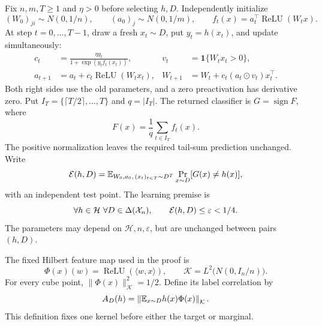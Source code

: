 \documentclass[11pt,letterpaper,pmlr,twoside]{jmlr}
\newcommand{\X}{\mathcal X}\newcommand{\Hc}{\mathcal H}
\newcommand{\Kc}{\mathcal K}\newcommand{\sgn}{\operatorname{sign}}
\newcommand{\relu}{\operatorname{ReLU}}\newcommand{\dc}{\operatorname{dc}}
\newcommand{\ind}{\mathbf1}\newcommand{\eps}{\varepsilon}
\newcommand{\ip}[2]{\langle #1,#2\rangle}\newcommand{\norm}[1]{\lVert #1\rVert}
\begin{document}
Fix $n,m,T\ge1$ and $\eta>0$ before selecting $h,D$. Independently initialize
\begin{equation}
 (W_0)_{ji}\sim N(0,1/n),\qquad (a_0)_j\sim N(0,1/m),
 \qquad f_t(x)=a_t^\top\relu(W_tx).
 \label{eq:init}
\end{equation}
At step $t=0,\ldots,T-1$, draw a fresh $x_t\sim D$, put $y_t=h(x_t)$, and update simultaneously:
\begin{equation}
 \begin{aligned}
 c_t&=\frac{\eta y_t}{1+\exp(y_tf_t(x_t))},
 &v_t&=\ind\{W_tx_t>0\},\\
 a_{t+1}&=a_t+c_t\relu(W_tx_t),
 &W_{t+1}&=W_t+c_t(a_t\odot v_t)x_t^\top.
 \end{aligned}
 \label{eq:actual}
\end{equation}
Both right sides use the old parameters, and a zero preactivation has derivative zero. Put $I_T=\{\lceil T/2\rceil,\ldots,T\}$ and $q=|I_T|$. The returned classifier is $G=\sgn F$, where
\begin{equation}
 F(x)=\frac1q\sum_{t\in I_T}f_t(x).
 \label{eq:tail}
\end{equation}
The positive normalization leaves the required tail-sum prediction unchanged. Write
\[
 \mathcal E(h,D)=\mathbb E_{W_0,a_0,\,(x_t)_{t<T}\sim D^T}
       \Pr_{x\sim D}[G(x)\ne h(x)],
\]
with an independent test point. The learning premise is
\begin{equation}
 \forall h\in\Hc\ \forall D\in\Delta(\X_n),\qquad \Risk(h,D)\le\eps<1/4.
 \label{eq:premise}
\end{equation}
The parameters may depend on $\Hc,n,\eps$, but are unchanged between pairs $(h,D)$.

The fixed Hilbert feature map used in the proof is
\begin{equation}
 \Phi(x)(w)=\relu(\ip wx),\qquad
 \Kc=L^2\bigl(N(0,I_n/n)\bigr).
 \label{eq:Hilbert}
\end{equation}
For every cube point, $\norm{\Phi(x)}_{\Kc}^2=1/2$. Define its label correlation by
\begin{equation}
 A_D(h)=\left\|\E_{x\sim D}h(x)\Phi(x)\right\|_{\Kc}.
 \label{eq:alignment}
\end{equation}
This definition fixes one kernel before either the target or marginal.
\end{document}
